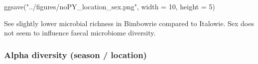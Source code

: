 \documentclass[
  letterpaper,
  DIV=11,
  numbers=noendperiod]{scrartcl}
\newenvironment{Shaded}{\begin{snugshade}}{\end{snugshade}}
\newcommand{\AttributeTok}[1]{\textcolor[rgb]{0.40,0.45,0.13}{#1}}
\newcommand{\DecValTok}[1]{\textcolor[rgb]{0.68,0.00,0.00}{#1}}
\newcommand{\FunctionTok}[1]{\textcolor[rgb]{0.28,0.35,0.67}{#1}}
\newcommand{\NormalTok}[1]{\textcolor[rgb]{0.00,0.23,0.31}{#1}}
\newcommand{\StringTok}[1]{\textcolor[rgb]{0.13,0.47,0.30}{#1}}
\begin{document}
\begin{Shaded}
\begin{Highlighting}[]
\FunctionTok{ggsave}\NormalTok{(}\StringTok{"../figures/noPY\_location\_sex.png"}\NormalTok{, }\AttributeTok{width =} \DecValTok{10}\NormalTok{, }\AttributeTok{height =} \DecValTok{5}\NormalTok{)}
\end{Highlighting}
\end{Shaded}

See slightly lower microbial richness in Bimbowrie compared to Italowie.
Sex does not seem to influence faecal microbiome diversity.

\subsubsection{Alpha diversity (season /
location)}\label{alpha-diversity-season-location}
\end{document}
